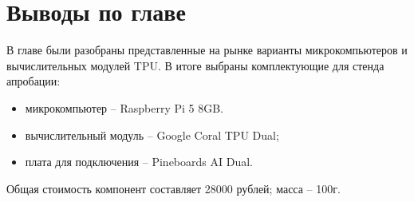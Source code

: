 \section{Выводы по главе}
В главе были разобраны представленные на рынке варианты микрокомпьютеров и вычислительных модулей TPU. В итоге выбраны комплектующие для стенда апробации:
\begin{itemize}
  \item микрокомпьютер -- Raspberry Pi 5 8GB.
  \item вычислительный модуль -- Google Coral TPU Dual;
  \item плата для подключения -- Pineboards AI Dual.
\end{itemize}
Общая стоимость компонент составляет 28000 рублей; масса -- 100г. 